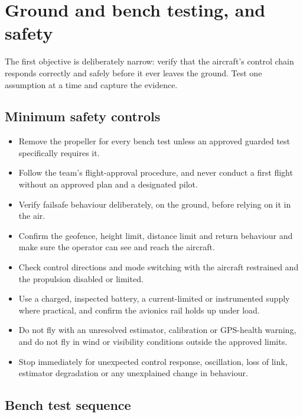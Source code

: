 \documentclass[11pt,a4paper]{article}
\begin{document}
\section{Ground and bench testing, and safety}

The first objective is deliberately narrow: verify that the aircraft's control
chain responds correctly and safely before it ever leaves the ground. Test one
assumption at a time and capture the evidence.

\subsection{Minimum safety controls}

\begin{itemize}
  \item Remove the propeller for every bench test unless an approved guarded test specifically requires it.
  \item Follow the team's flight-approval procedure, and never conduct a first flight without an approved plan and a designated pilot.
  \item Verify failsafe behaviour deliberately, on the ground, before relying on it in the air.
  \item Confirm the geofence, height limit, distance limit and return behaviour and make sure the operator can see and reach the aircraft.
  \item Check control directions and mode switching with the aircraft restrained and the propulsion disabled or limited.
  \item Use a charged, inspected battery, a current-limited or instrumented supply where practical, and confirm the avionics rail holds up under load.
  \item Do not fly with an unresolved estimator, calibration or GPS-health warning, and do not fly in wind or visibility conditions outside the approved limits.
  \item Stop immediately for unexpected control response, oscillation, loss of link, estimator degradation or any unexplained change in behaviour.
\end{itemize}

\subsection{Bench test sequence}
\end{document}

